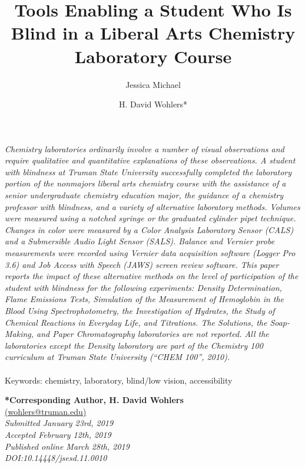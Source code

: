 \documentclass[11.5pt]{sig-alternate} %
\makeatletter
\let\oldabstract\abstract
\let\oldendabstract\endabstract
\renewenvironment{abstract} %
{\renewenvironment{quotation}%
               {\list{}{\addtolength{\leftmargin}{1em} %
                        \listparindent 1.5em%
                        \itemindent    \listparindent%
                        \rightmargin   \leftmargin%
                        \parsep        \z@ \@plus\p@}%
                \item\relax}%
               {\endlist}%
\oldabstract}
{\oldendabstract}
\makeatother
\begin{document}
\title{Tools Enabling a Student Who Is Blind in a Liberal Arts
Chemistry Laboratory Course}

\author[1]{\large \color{blue}Jessica Michael}
\author[2]{\large \color{blue}H. David Wohlers*}
\toappear{}
\maketitle
\begin{@twocolumnfalse} 
\begin{abstract}
\item 
\textit {Chemistry laboratories ordinarily involve a number of visual observations and require qualitative and quantitative explanations of these observations. A student with blindness at Truman State University successfully completed the laboratory portion of the nonmajors liberal arts chemistry course with the assistance of a senior undergraduate chemistry education major, the guidance of a chemistry professor with blindness, and a variety of alternative laboratory methods. Volumes were measured using a notched syringe or the graduated cylinder pipet technique. Changes in color were measured by a Color Analysis Laboratory Sensor (CALS) and a Submersible Audio Light Sensor (SALS). Balance and Vernier probe measurements were recorded using Vernier data acquisition software (Logger Pro 3.6) and Job Access with Speech (JAWS) screen review software. This paper reports the impact of these alternative methods on the level of participation of the student with blindness for the following experiments: Density Determination, Flame Emissions Tests, Simulation of the Measurement of Hemoglobin in the Blood Using Spectrophotometry, the Investigation of Hydrates, the Study of Chemical Reactions in Everyday Life, and Titrations. The Solutions, the Soap-Making, and Paper Chromatography laboratories are not reported. All the laboratories except the Density laboratory are part of the Chemistry 100 curriculum at Truman State University (“CHEM 100”, 2010).}
\\ \\
Keywords: chemistry, laboratory, blind/low vision, accessibility
\end{abstract}
\end{@twocolumnfalse}


\textbf{*Corresponding Author, H. David Wohlers}\\
\href{mailto: (wohlers@truman.edu) }{(wohlers@truman.edu)} \\
\textit{Submitted January 23rd, 2019 }\\
\textit{Accepted February 12th, 2019} \\
\textit{Published online March 28th, 2019 } \\
\textit{DOI:10.14448/jsesd.11.0010} \\
\pagebreak
\clearpage
\end{document}
